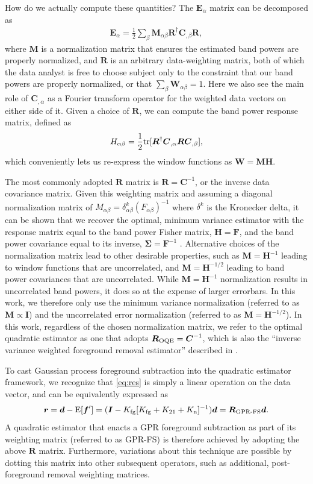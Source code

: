 \documentclass[a4paper,fleqn,usenatbib]{mnras}
\def\d{\boldsymbol{d}}
\def\E{\boldsymbol{E}}
\def\f{\boldsymbol{f}}
\def\F{\boldsymbol{F}}
\def\H{\boldsymbol{H}}
\def\r{\boldsymbol{r}}
\def\R{\boldsymbol{R}}
\def\M{\boldsymbol{M}}
\def\C{\boldsymbol{C}}
\def\W{\boldsymbol{W}}
\def\I{\boldsymbol{I}}
\def\Exp{{\rm E}}
\def\Kto{K_{\rm 21}}
\def\Kfg{K_{\rm fg}}
\def\Kn{K_{\rm n}}
\def\tr{{\rm tr}}
\begin{document}
How do we actually compute these quantities?
The $\E_\alpha$ matrix can be decomposed as
\begin{align}
\label{eq:qe_E}
\E_\alpha = \frac{1}{2}\sum_\beta \M_{\alpha\beta} \R^\dagger \C_{,\beta} \R,
\end{align}
where $\M$ is a normalization matrix that ensures the estimated band powers are properly normalized, and $\R$ is an arbitrary data-weighting matrix, both of which the data analyst is free to choose subject only to the constraint that our band powers are properly normalized, or that $\sum_\beta\W_{\alpha\beta}=1$.
Here we also see the main role of $\C_{,\alpha}$ as a Fourier transform operator for the weighted data vectors on either side of it.
Given a choice of $\R$, we can compute the band power response matrix, defined as
\begin{align}
\label{eq:qe_response}
H_{\alpha\beta} = \frac{1}{2}\tr[\R^\dagger\C_{,\alpha}\R\C_{,\beta}],
\end{align}
which conveniently lets us re-express the window functions as $\W = \M \H$.

The most commonly adopted $\R$ matrix is $\R = \C^{-1}$, or the inverse data covariance matrix.
Given this weighting matrix and assuming a diagonal normalization matrix of $M_{\alpha\beta} = \delta^k_{\alpha\beta}\left(F_{\alpha\beta}\right)^{-1}$ where $\delta^k$ is the Kronecker delta, it can be shown that we recover the optimal, minimum variance estimator with the response matrix equal to the band power Fisher matrix, $\H = \F$, and the band power covariance equal to its inverse, $\boldsymbol{\Sigma} = \F^{-1}$ \citep{Hamilton1997a, Tegmark1997, Bond2000}.
Alternative choices of the normalization matrix lead to other desirable properties, such as $\M=\H^{-1}$ leading to window functions that are uncorrelated, and $\M=\H^{-1/2}$ leading to band power covariances that are uncorrelated.
While $\M=\H^{-1}$ normalization results in uncorrelated band powers, it does so at the expense of larger errorbars.
In this work, we therefore only use the minimum variance normalization (referred to as $\M\propto\I$) and the uncorrelated error normalization (referred to as $\M=\H^{-1/2}$).
In this work, regardless of the chosen normalization matrix, we refer to the optimal quadratic estimator as one that adopts $\R_{\rm OQE} = \C^{-1}$, which is also the ``inverse variance weighted foreground removal estimator'' described in \citet{Liu2011}.

To cast Gaussian process foreground subtraction into the quadratic estimator framework, we recognize that \autoref{eq:res} is simply a linear operation on the data vector, and can be equivalently expressed as
\begin{align}
\label{eq:gprfs}
\r = \d - \Exp[\f^\prime] = (\I - \Kfg[\Kfg + \Kto + \Kn]^{-1})\d  = \R_{\operatorname{GPR-FS}}\d.
\end{align}
A quadratic estimator that enacts a GPR foreground subtraction as part of its weighting matrix (referred to as GPR-FS) is therefore achieved by adopting the above $\R$ matrix.
Furthermore, variations about this technique are possible by dotting this matrix into other subsequent operators, such as additional, post-foreground removal weighting matrices.
\end{document}
